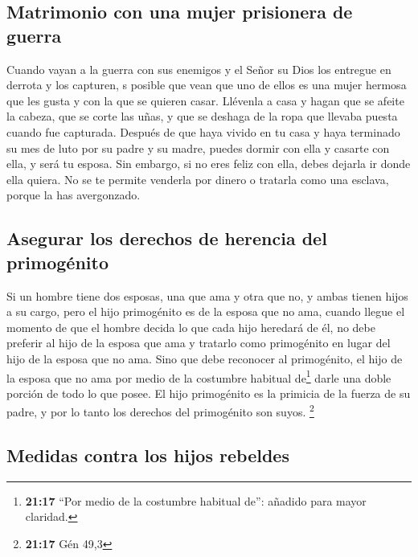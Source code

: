 \hypertarget{matrimonio-con-una-mujer-prisionera-de-guerra}{%
\subsection{Matrimonio con una mujer prisionera de
guerra}\label{matrimonio-con-una-mujer-prisionera-de-guerra}}

 Cuando vayan a la guerra con sus enemigos y el Señor su
Dios los entregue en derrota y los capturen,  s posible
que vean que uno de ellos es una mujer hermosa que les gusta y con la
que se quieren casar.  Llévenla a casa y hagan que se
afeite la cabeza, que se corte las uñas,  y que se
deshaga de la ropa que llevaba puesta cuando fue capturada. Después de
que haya vivido en tu casa y haya terminado su mes de luto por su padre
y su madre, puedes dormir con ella y casarte con ella, y será tu esposa.
 Sin embargo, si no eres feliz con ella, debes dejarla ir
donde ella quiera. No se te permite venderla por dinero o tratarla como
una esclava, porque la has avergonzado.

\hypertarget{asegurar-los-derechos-de-herencia-del-primoguxe9nito}{%
\subsection{Asegurar los derechos de herencia del
primogénito}\label{asegurar-los-derechos-de-herencia-del-primoguxe9nito}}

 Si un hombre tiene dos esposas, una que ama y otra que
no, y ambas tienen hijos a su cargo, pero el hijo primogénito es de la
esposa que no ama,  cuando llegue el momento de que el
hombre decida lo que cada hijo heredará de él, no debe preferir al hijo
de la esposa que ama y tratarlo como primogénito en lugar del hijo de la
esposa que no ama.  Sino que debe reconocer al
primogénito, el hijo de la esposa que no ama por medio de la costumbre
habitual de\footnote{\textbf{21:17} ``Por medio de la costumbre habitual
  de'': añadido para mayor claridad.} darle una doble porción de todo lo
que posee. El hijo primogénito es la primicia de la fuerza de su padre,
y por lo tanto los derechos del primogénito son suyos. \footnote{\textbf{21:17}
  Gén 49,3}

\hypertarget{medidas-contra-los-hijos-rebeldes}{%
\subsection{Medidas contra los hijos
rebeldes}\label{medidas-contra-los-hijos-rebeldes}}

